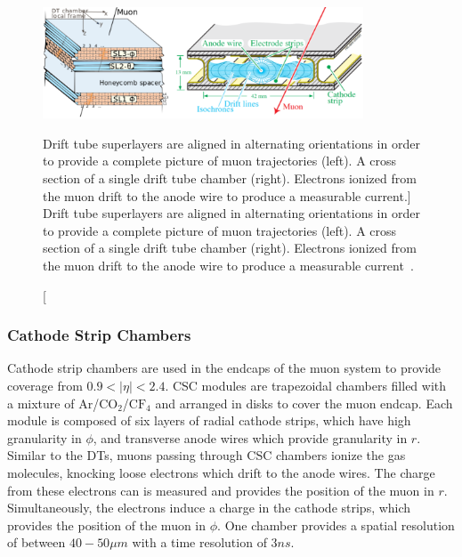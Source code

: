 \begin{figure}[htpb]
	\centering
	\includegraphics[width=0.85\textwidth]{figs/03_experiment/CMS_DT.png}
	\caption
	[Drift tube superlayers are aligned in alternating orientations in order to provide a complete picture of muon trajectories (left). A cross section of a single drift tube chamber (right). Electrons ionized from the muon drift to the anode wire to produce a measurable current.]
	{Drift tube superlayers are aligned in alternating orientations in order to provide a complete picture of muon trajectories (left). A cross section of a single drift tube chamber (right). Electrons ionized from the muon drift to the anode wire to produce a measurable current~\cite{CMSDT}.}
	\label{fig:DT}
\end{figure}

\subsubsection{Cathode Strip Chambers} \label{sec:CMS_CSC}
Cathode strip chambers are used in the endcaps of the muon system to provide coverage from $0.9<\left|\eta\right|<2.4$. CSC modules are trapezoidal chambers filled with a mixture of Ar/$\text{CO}_2$/$\text{CF}_4$ and arranged in disks to cover the muon endcap. Each module is composed of six layers of radial cathode strips, which have high granularity in $\phi$, and transverse anode wires which provide granularity in $r$. Similar to the DTs, muons passing through CSC chambers ionize the gas molecules, knocking loose electrons which drift to the anode wires. The charge from these electrons can is measured and provides the position of the muon in $r$. Simultaneously, the electrons induce a charge in the cathode strips, which provides the position of the muon in $\phi$. One chamber provides a spatial resolution of between $40-50\unit{\mu m}$ with a time resolution of $3\unit{ns}$.

